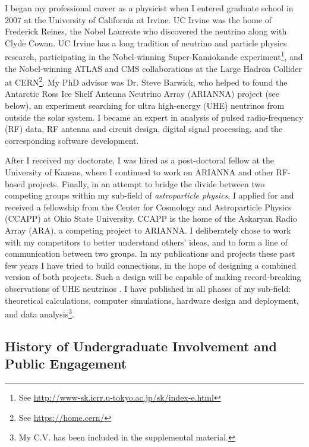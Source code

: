 \documentclass[../../main.tex]{subfiles}
\begin{document}
I began my professional career as a physicist when I entered graduate school in 2007 at the University of California at Irvine.  UC Irvine was the home of Frederick Reines, the Nobel Laureate who discovered the neutrino along with Clyde Cowan.  UC Irvine has a long tradition of neutrino and particle physics research, participating in the Nobel-winning Super-Kamiokande experiment\footnote{See \url{http://www-sk.icrr.u-tokyo.ac.jp/sk/index-e.html}}, and the Nobel-winning ATLAS and CMS collaborations at the Large Hadron Collider at CERN\footnote{See \url{https://home.cern/}}.  My PhD advisor was Dr. Steve Barwick, who helped to found the Antarctic Ross Ice Shelf Antenna Neutrino Array (ARIANNA) project (see below), an experiment searching for ultra high-energy (UHE) neutrinos from outside the solar system.  I became an expert in analysis of pulsed radio-frequency (RF) data, RF antenna and circuit design, digital signal processing, and the corresponding software development.  \\ \hspace{0.1cm}

After I received my doctorate, I was hired as a post-doctoral fellow at the University of Kansas, where I continued to work on ARIANNA and other RF-based projects.  Finally, in an attempt to bridge the divide between two competing groups within my sub-field of \textit{astroparticle physics}, I applied for and received a fellowship from the Center for Cosmology and Astroparticle Physics (CCAPP) at Ohio State University.  CCAPP is the home of the Askaryan Radio Array (ARA), a competing project to ARIANNA.  I deliberately chose to work with my competitors to better understand others' ideas, and to form a line of communication between two groups.  In my publications and projects these past few years I have tried to build connections, in the hope of designing a combined version of both projects.  Such a design will be capable of making record-breaking observations of UHE neutrinos \cite{connolly2016radio}.  I have published in all phases of my sub-field: theoretical calculations, computer simulations, hardware design and deployment, and data analysis\footnote{My C.V. has been included in the supplemental material.}.

\subsection{History of Undergraduate Involvement and Public Engagement}
\end{document}
